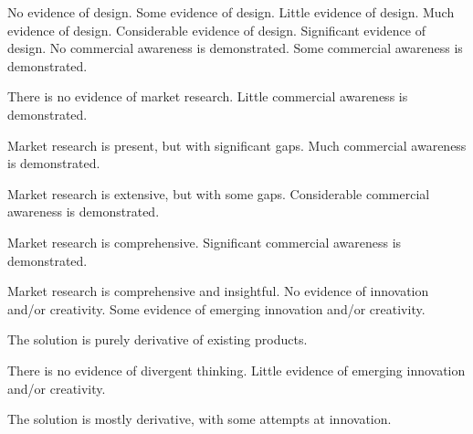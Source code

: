 \documentclass{../../fal_assignment}
\begin{document}
	\begin{markingrubric}
		\grade\fail No evidence of design.
		\grade Some evidence of design.
		\grade Little evidence of design.
		\grade Much evidence of design.
		\grade Considerable evidence of design.
		\grade Significant evidence of design.
		\grade\fail No commercial awareness is demonstrated.
		\grade Some commercial awareness is demonstrated.
		\par There is no evidence of market research.
		\grade Little commercial awareness is demonstrated.
		\par Market research is present, but with significant gaps.
		\grade Much commercial awareness is demonstrated.
		\par Market research is extensive, but with some gaps.
		\grade Considerable commercial awareness is demonstrated.
		\par Market research is comprehensive.
		\grade Significant commercial awareness is demonstrated.
		\par Market research is comprehensive and insightful.
		\grade\fail No evidence of innovation and/or creativity.
		\grade Some evidence of emerging innovation and/or creativity.
		\par The solution is purely derivative of existing products.
		\par There is no evidence of divergent thinking.
		\grade Little evidence of emerging innovation and/or creativity.
		\par The solution is mostly derivative, with some attempts at innovation.

\end{markingrubric}
\end{document}
